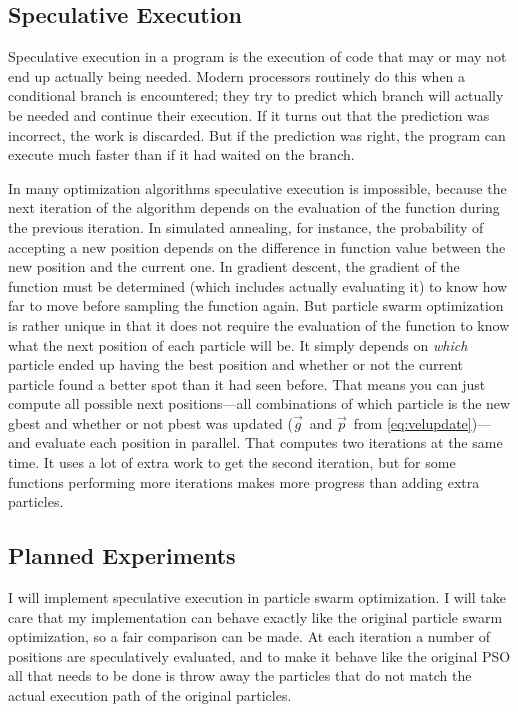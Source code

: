 \documentclass[onecolumn, 12pt]{article}
\providecommand{\gbest}{\ensuremath{\Vec{g}}}
\providecommand{\pbest}{\ensuremath{\Vec{p}}}
\begin{document}
\subsection{Speculative Execution}
\label{sec:specex}

Speculative execution in a program is the execution of code that may or may not
end up actually being needed.  Modern processors routinely do this when a
conditional branch is encountered; they try to predict which branch will
actually be needed and continue their execution.  If it turns out that the
prediction was incorrect, the work is discarded.  But if the prediction was
right, the program can execute much faster than if it had waited on the branch.

In many optimization algorithms speculative execution is impossible, because
the next iteration of the algorithm depends on the evaluation of the function
during the previous iteration.  In simulated annealing, for instance, the
probability of accepting a new position depends on the difference in function
value between the new position and the current one.  In gradient descent, the
gradient of the function must be determined (which includes actually evaluating
it) to know how far to move before sampling the function again.  But particle
swarm optimization is rather unique in that it does not require the evaluation
of the function to know what the next position of each particle will be.  It
simply depends on \emph{which} particle ended up having the best position and
whether or not the current particle found a better spot than it had seen
before.  That means you can just compute all possible next positions---all
combinations of which particle is the new gbest and whether or not pbest was
updated (\gbest\ and \pbest\ from \eqref{eq:velupdate})---and evaluate each
position in parallel.  That computes two iterations at the same time.  It uses
a lot of extra work to get the second iteration, but for some functions
performing more iterations makes more progress than adding extra particles.

\subsection{Planned Experiments}

I will implement speculative execution in particle swarm optimization.  I will
take care that my implementation can behave exactly like the original particle
swarm optimization, so a fair comparison can be made.  At each iteration a 
number of positions are speculatively evaluated, and to make it behave like
the original PSO all that needs to be done is throw away the particles that
do not match the actual execution path of the original particles.  
\end{document}
